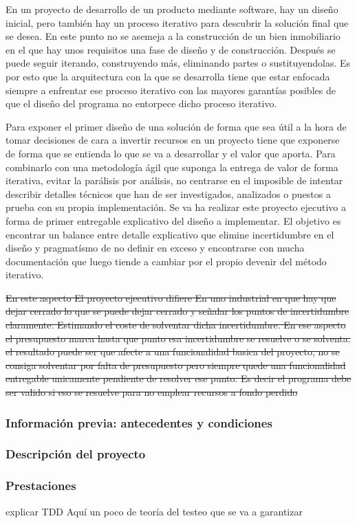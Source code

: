 En un proyecto de desarrollo de un producto mediante software, hay un diseño inicial, pero también hay un proceso iterativo para descubrir la solución final que se desea. En este punto no se asemeja a la construcción de un bien inmobiliario en el que hay unos requisitos una fase de diseño y de construcción. Después se puede seguir iterando, construyendo más, eliminando partes o sustituyendolas. Es por esto que la arquitectura con la que se desarrolla tiene que estar enfocada siempre a enfrentar ese proceso iterativo con las mayores garantías posibles de que el diseño del programa no entorpece dicho proceso iterativo.

Para exponer el primer diseño de una solución de forma que sea útil a la hora de tomar decisiones de cara a invertir recursos en un proyecto tiene que exponerse de forma que se entienda lo que se va a desarrollar y el valor que aporta. Para combinarlo con una metodología ágil que suponga la entrega de valor de forma iterativa, evitar la parálisis por análisis, no centrarse en el imposible de intentar describir detalles técnicos que han de ser investigados, analizados o puestos a prueba con su propia implementación. Se va ha realizar este proyecto ejecutivo a forma de primer entregable explicativo del diseño a implementar. El objetivo es encontrar un balance entre detalle explicativo que elimine incertidumbre en el diseño y pragmatísmo de no definir en exceso y encontrarse con mucha documentación que luego tiende a cambiar por el propio devenir del método iterativo.

\sout{En este aspecto El proyecto ejecutivo difiere En uno industrial en que hay que dejar cerrado lo que se puede dejar cerrado y señalar los puntos de incertidumbre claramente. Estimando el coste de solventar dicha incertidumbre. En ese aspecto el presupuesto marca hasta que punto esa incertidumbre se resuelve o se solventa. el resultado puede ser que afecte a una funcionalidad basica del proyecto, no se consiga solventar por falta de presupuesto pero siempre quede una funcionalidad entregable unicamente pendiente de resolver ese punto. Es decir el programa debe ser valido si eso se resuelve para no emplear recursos a fondo perdido}

\subsubsection{Información previa: antecedentes y condiciones}
    
\subsubsection{Descripción del proyecto}
    
\subsubsection{Prestaciones}
explicar TDD Aquí un poco de teoría del testeo que se va a garantizar



